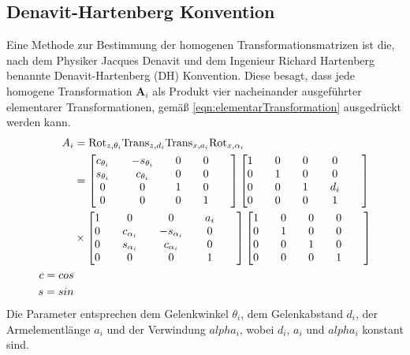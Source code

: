 \subsection*{Denavit-Hartenberg Konvention}
Eine Methode zur Bestimmung der homogenen Transformationsmatrizen ist die, nach  dem Physiker Jacques Denavit und dem Ingenieur Richard Hartenberg benannte Denavit-Hartenberg (DH) Konvention. Diese besagt, dass jede homogene Transformation $\bm{A}_i$ als Produkt vier nacheinander ausgeführter elementarer Transformationen, gemäß \ref{eqn:elementarTransformation} ausgedrückt werden kann. 
\begin{align}
	\label{eqn:elementarTransformation}
	A_i &= \text{Rot}_{z,\theta_i}\text{Trans}_{z,d_i}\text{Trans}_{x,a_i}\text{Rot}_{x,\alpha_i} \\
	&= \left[\begin{matrix}
		c_{\theta_i} &\quad -s_{\theta_i} &\quad 0 &\quad 0 \\
		s_{\theta_i} &\quad c_{\theta_i} &\quad 0 &\quad 0 \\
		0 &\quad 0 &\quad 1 &\quad 0 &\quad \\ 
		0 &\quad 0 &\quad 0 &\quad 1 &\quad 
	\end{matrix}\right] 
	\left[\begin{matrix}
		1 &\quad 0 &\quad 0 &\quad 0 \\
		0 &\quad 1 &\quad 0 &\quad 0 \\
		0 &\quad 0 &\quad 1 &\quad d_i &\quad \\ 
		0 &\quad 0 &\quad 0 &\quad 1 &\quad 
	\end{matrix}\right] \notag \\
	& \times
	\left[\begin{matrix}
		1 &\quad 0 &\quad 0 &\quad a_i \\
		0 &\quad c_{\alpha_i} &\quad -s_{\alpha_i} &\quad 0 \\
		0 &\quad s_{\alpha_i} &\quad c_{\alpha_i} &\quad 0 &\quad \\ 
		0 &\quad 0 &\quad 0 &\quad 1 &\quad 
	\end{matrix}\right]
	\left[\begin{matrix}
		1 &\quad 0 &\quad 0 &\quad 0 \\
		0 &\quad 1 &\quad 0 &\quad 0 \\
		0 &\quad 0 &\quad 1 &\quad 0 &\quad \\ 
		0 &\quad 0 &\quad 0 &\quad 1 &\quad 
	\end{matrix}\right]
	\notag \\
	c = cos\notag \\
	s = sin \notag 
\end{align}
Die Parameter entsprechen dem Gelenkwinkel $\theta_i$, dem Gelenkabstand $d_i$, der Armelementlänge $a_i$ und der Verwindung $alpha_i$, wobei $d_i$, $a_i$ und $alpha_i$ konstant sind. \cite[S.~79]{Spong.2020}
%
